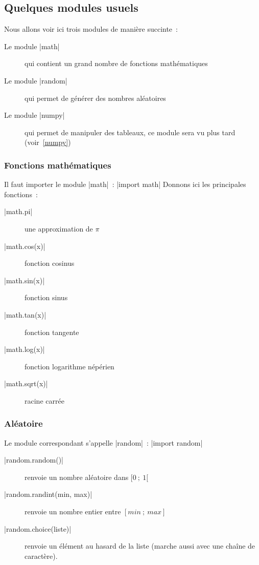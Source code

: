 	\subsection{Quelques modules usuels}
	
		Nous allons voir ici trois modules de manière succinte~:
		\begin{description}
			\item[Le module \python|math|] qui contient un grand nombre de fonctions mathématiques
			\item[Le module \python|random|] qui permet de générer des nombres aléatoires
			\item[Le module \python|numpy|] qui permet de manipuler des tableaux, ce module sera vu plus tard (voir~\ref{numpy})
		\end{description}
		
		\subsubsection{Fonctions mathématiques}
		Il faut importer le module \python|math|~: \python|import math|
		Donnons ici les principales fonctions~:
		\begin{description}
			\item[\python|math.pi|] une approximation de $\pi$
			\item[\python|math.cos(x)|] fonction cosinus
			\item[\python|math.sin(x)|] fonction sinus
			\item[\python|math.tan(x)|] fonction tangente
			\item[\python|math.log(x)|] fonction logarithme népérien
			\item[\python|math.sqrt(x)|] racine carrée
		\end{description}
		
		\subsubsection{Aléatoire}
		Le module correspondant s'appelle \python|random|~: \python|import random|
		\begin{description}
			\item[\python|random.random()|] renvoie un nombre aléatoire dans $[0~;\ 1[$
			\item[\python|random.randint(min, max)|] renvoie un nombre entier entre $[min~;\ max]$
			\item[\python|random.choice(liste)|] renvoie un élément au hasard de la liste (marche aussi avec une chaîne de caractère).
		\end{description}

